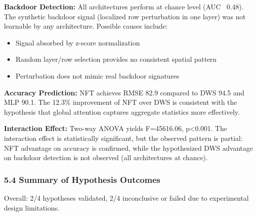\textbf{Backdoor Detection:} All architectures perform at chance level (AUC ~0.48). The synthetic backdoor signal (localized row perturbation in one layer) was not learnable by any architecture. Possible causes include:
\begin{itemize}
\item Signal absorbed by z-score normalization
\item Random layer/row selection provides no consistent spatial pattern
\item Perturbation does not mimic real backdoor signatures
\end{itemize}

\textbf{Accuracy Prediction:} NFT achieves RMSE 82.9 compared to DWS 94.5 and MLP 90.1. The 12.3\% improvement of NFT over DWS is consistent with the hypothesis that global attention captures aggregate statistics more effectively.

\textbf{Interaction Effect:} Two-way ANOVA yields F=45616.06, p<0.001. The interaction effect is statistically significant, but the observed pattern is partial: NFT advantage on accuracy is confirmed, while the hypothesized DWS advantage on backdoor detection is not observed (all architectures at chance).

\subsubsection{5.4 Summary of Hypothesis Outcomes}

\begin{table}[htbp]
\centering
{}
\end{table}

Overall: 2/4 hypotheses validated, 2/4 inconclusive or failed due to experimental design limitations.
